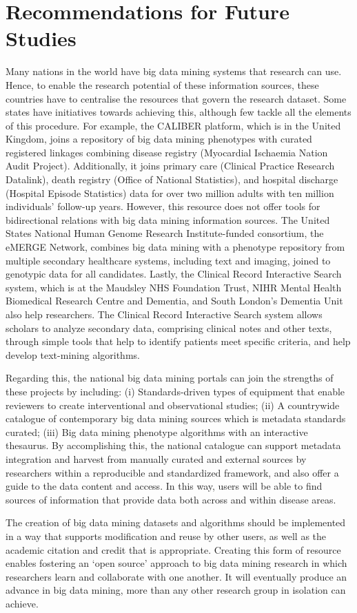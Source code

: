 \documentclass[sigconf]{acmart}
\begin{document}
\section{Recommendations for Future Studies}
Many nations in the world have big data mining systems that research can use.  Hence, to enable the research potential of these information sources, these countries have to centralise the resources that govern the research dataset.
Some states have initiatives towards achieving this, although few tackle all the elements of this procedure.
For example, the CALIBER platform, which is in the United Kingdom, joins a repository of big data mining phenotypes with curated registered linkages combining disease registry (Myocardial Ischaemia Nation Audit Project).
Additionally, it joins primary care (Clinical Practice Research Datalink), death registry (Office of National Statistics), and hospital discharge (Hospital Episode Statistics) data for over two million adults with ten million individuals’ follow-up years.
However, this resource does not offer tools for bidirectional relations with big data mining information sources.
The United States National Human Genome Research Institute-funded consortium, the eMERGE Network, combines big data mining with a phenotype repository from multiple secondary healthcare systems, including text and imaging, joined to genotypic data for all candidates.
Lastly, the Clinical Record Interactive Search system, which is at the Maudsley NHS Foundation Trust, NIHR Mental Health Biomedical Research Centre and Dementia, and South London's Dementia Unit also help researchers.
The Clinical Record Interactive Search system allows scholars to analyze secondary data, comprising clinical notes and other texts, through simple tools that help to identify patients meet specific criteria, and help develop text-mining algorithms.
\par Regarding this, the national big data mining portals can join the strengths of these projects by including: (i) Standards-driven types of equipment that enable reviewers to create interventional and observational studies;
(ii) A countrywide catalogue of contemporary big data mining sources which is metadata standards curated;
(iii)  Big data mining phenotype algorithms with an interactive thesaurus.
By accomplishing this, the national catalogue can support metadata integration and harvest from manually curated and external sources by researchers within a reproducible and standardized framework, and also offer a guide to the data content and access.
In this way, users will be able to find sources of information that provide data both across and within disease areas.
\par The creation of big data mining datasets and algorithms should be implemented in a way that supports modification and reuse by other users, as well as the academic citation and credit that is appropriate.
Creating this form of resource enables fostering an `open source' approach to big data mining research in which researchers learn and collaborate with one another.
It will eventually produce an advance in big data mining, more than any other research group in isolation can achieve.
\end{document}
